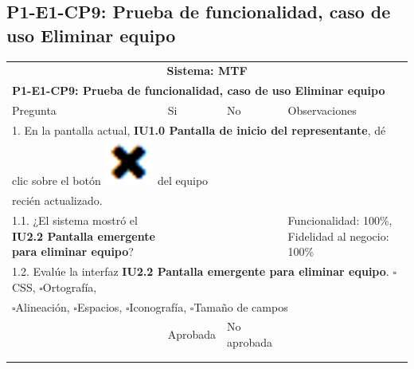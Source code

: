 \documentclass[oneside,10pt]{book}
\begin{document}
\subsection{P1-E1-CP9: Prueba de funcionalidad, caso de uso Eliminar equipo}

\begin{tabularx}{\textwidth}{ X l l X }
\multicolumn{4}{c}{\cellcolor[HTML]{9B9B9B}\textbf{Sistema: MTF}}                                                                                     \\
\multicolumn{4}{l}{\cellcolor[HTML]{EFEFEF}\textbf{P1-E1-CP9: Prueba de funcionalidad, caso de uso Eliminar equipo}}                                                   \\ \hline
\multicolumn{1}{|X|}{Pregunta}                               & \multicolumn{1}{l|}{Si} & \multicolumn{1}{l|}{No} & \multicolumn{1}{X|}{Observaciones} \\ \hline

\multicolumn{4}{|l|}{1. En la pantalla actual, \textbf{IU1.0 Pantalla de inicio del representante}, dé clic sobre el botón \includegraphics[scale=.3]{images/eliminate} del equipo}              \\
\multicolumn{4}{|l|}{recién actualizado.} \\ \hline
\multicolumn{1}{|X|}{1.1. ¿El sistema mostró el \textbf{IU2.2 Pantalla emergente para eliminar equipo}?} & \multicolumn{1}{l|}{}   & \multicolumn{1}{l|}{}   & \multicolumn{1}{X|}{Funcionalidad: 100\%, Fidelidad al negocio: 100\%}              \\ \hline

\multicolumn{4}{|l|}{1.2. Evalúe la interfaz \textbf{IU2.2 Pantalla emergente para eliminar equipo}. $\square$CSS, $\square$Ortografía,}                        \\
\multicolumn{4}{|l|}{$\square$Alineación, $\square$Espacios, $\square$Iconografía, $\square$Tamaño de campos}                        \\ \hline
\multicolumn{1}{|l|}{ }	& \multicolumn{1}{l|}{Aprobada} & \multicolumn{1}{l|}{No aprobada} & \multicolumn{1}{l|}{ } \\ \hline
\multicolumn{1}{|l|}{ } & \multicolumn{1}{l|}{ } & \multicolumn{1}{l|}{ } & \multicolumn{1}{l|}{ } \\
\multicolumn{1}{|l|}{ } & \multicolumn{1}{l|}{ } & \multicolumn{1}{l|}{ } & \multicolumn{1}{l|}{ } \\ \hline


\end{tabularx}
\end{document}
